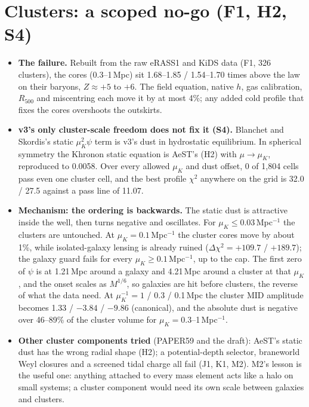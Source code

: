 \documentclass[10pt]{article}
\begin{document}
\section{Clusters: a scoped no-go (F1, H2, S4)}
\begin{itemize}
\item \textbf{The failure.} Rebuilt from the raw eRASS1 and KiDS data (F1, 326 clusters), the cores (0.3--1\,Mpc) sit 1.68--1.85 / 1.54--1.70 times above the law on their baryons, $Z\approx+5$ to $+6$. The field equation, native $h$, gas calibration, $R_{500}$ and miscentring each move it by at most 4\%; any added cold profile that fixes the cores overshoots the outskirts.
\item \textbf{v3's only cluster-scale freedom does not fix it (S4).} Blanchet and Skordis's static $\mu_K^2\psi$ term is v3's dust in hydrostatic equilibrium. In spherical symmetry the Khronon static equation is AeST's (H2) with $\mu\to\mu_K$, reproduced to 0.0058. Over every allowed $\mu_K$ and dust offset, 0 of 1,804 cells pass even one cluster cell, and the best profile $\chi^2$ anywhere on the grid is 32.0 / 27.5 against a pass line of 11.07.
\item \textbf{Mechanism: the ordering is backwards.} The static dust is attractive inside the well, then turns negative and oscillates. For $\mu_K\le0.03$\,Mpc$^{-1}$ the clusters are untouched. At $\mu_K=0.1$\,Mpc$^{-1}$ the cluster cores move by about 1\%, while isolated-galaxy lensing is already ruined ($\Delta\chi^2=+109.7$ / $+189.7$); the galaxy guard fails for every $\mu_K\ge0.1$\,Mpc$^{-1}$, up to the cap. The first zero of $\psi$ is at 1.21\,Mpc around a galaxy and 4.21\,Mpc around a cluster at that $\mu_K$, and the onset scales as $M^{1/6}$, so galaxies are hit before clusters, the reverse of what the data need. At $\mu_K^{-1}=1$ / 0.3 / 0.1\,Mpc the cluster MID amplitude becomes 1.33 / $-3.84$ / $-9.86$ (canonical), and the absolute dust is negative over 46--89\% of the cluster volume for $\mu_K=0.3$--1\,Mpc$^{-1}$.
\item \textbf{Other cluster components tried} (PAPER59 and the draft): AeST's static dust has the wrong radial shape (H2); a potential-depth selector, braneworld Weyl closures and a screened tidal charge all fail (J1, K1, M2). M2's lesson is the useful one: anything attached to every mass element acts like a halo on small systems; a cluster component would need its own scale between galaxies and clusters.
\end{itemize}
\end{document}

